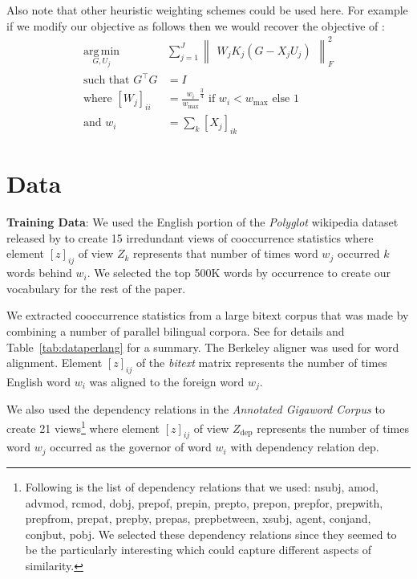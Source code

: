 \documentclass[11pt]{article}
\newcommand{\xline}[0]{\noindent\underline{\makebox[0.1cm][l]{}}}
\begin{document}
Also note that other heuristic weighting schemes could be used
here. For example if we modify our objective as follows then we would
recover the objective of \cite{pennington2014glove}:
\begin{equation}
  \label{eq:gcca3}
\begin{split}
  \operatorname*{arg\,min}_{G,U_j} & \sum_{j=1}^J \begin{Vmatrix} W_j K_j(G - X_jU_j) \end{Vmatrix}^2_F \\
  \text{such that } G^\top G &= I \\
  \text{where } [W_j]_{ii} &= \frac{w_i}{w_{\max}}^{\frac{3}{4}} \text{ if } w_i <
  w_{\max} \text{ else } 1 \\
  \text{and } w_i &=  \sum_k [X_j]_{ik}
\end{split}
\end{equation}

\section{Data}
\label{sec:data}
\textbf{Training Data}: We used the English portion of the \textit{Polyglot} wikipedia dataset
released by \cite{al2013polyglot} to create 15 irredundant views of
cooccurrence statistics where element $[z]_{ij}$ of view $Z_k$
represents that number of times word $w_j$ occurred $k$ words behind
$w_i$.
We selected the top 500K words by occurrence to 
create our vocabulary for the rest of the paper.

We extracted cooccurrence statistics from a large bitext corpus that was made by combining a
number of parallel bilingual corpora. See \cite{ganitkevitch2013ppdb} for details and
Table~\ref{tab:dataperlang} for a summary. The Berkeley aligner was used for word alignment. Element
$[z]_{ij}$ of the \textit{bitext} matrix represents the number of times English
word $w_i$ was aligned to the foreign word $w_j$.

We also used the dependency relations in the \textit{Annotated Gigaword Corpus} to
create 21 views\footnote{Following is the list of dependency relations
  that we used:
nsubj, amod, advmod, rcmod, dobj, prep\xline{}of, prep\xline{}in,
prep\xline{}to, prep\xline{}on, prep\xline{}for, prep\xline{}with,
prep\xline{}from, prep\xline{}at, prep\xline{}by, prep\xline{}as,
prep\xline{}between, xsubj, agent, conj\xline{}and, conj\xline{}but, pobj. We
selected these dependency relations since they seemed to be the
particularly interesting which could capture different aspects of
similarity.} 
where element $[z]_{ij}$ of view 
$Z_{\textrm{dep}}$ represents the number of times word $w_j$ occurred as the
governor of word $w_i$ with dependency relation $\textrm{dep}$. 
\end{document}
